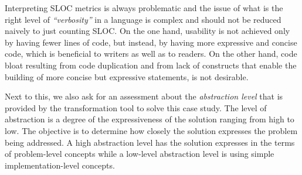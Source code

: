 Interpreting SLOC metrics is always problematic and the issue of what is the right level of \emph{``verbosity''} in a language is complex and should not be reduced naively to just counting SLOC.
On the one hand, usability is not achieved only by having fewer lines of code, but instead, by having more expressive and concise code, which is beneficial to writers as well as to readers.
On the other hand, code bloat resulting from code duplication and from lack of constructs that enable the building of more concise but expressive statements, is not desirable.

Next to this, we also ask for an assessment about the \emph{abstraction level} that is provided by the transformation tool to solve this case study.
The level of abstraction is a degree of the expressiveness of the solution ranging from high to low.
The objective is to determine how closely the solution expresses the problem being addressed.
A high abstraction level has the solution expresses in the terms of problem-level concepts while a low-level abstraction level is using simple implementation-level concepts.